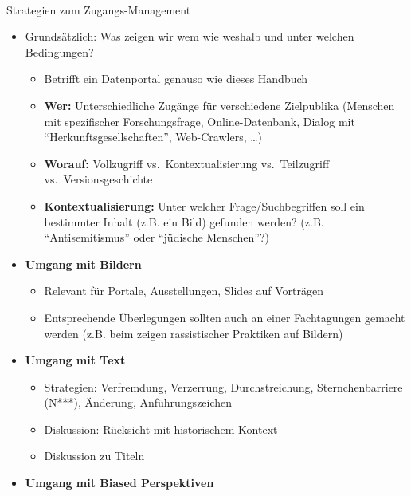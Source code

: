 \documentclass[
  letterpaper,
  DIV=11,
  numbers=noendperiod]{scrartcl}
\makeatletter
\let\oldparagraph\paragraph
\renewcommand{\paragraph}{
    \@ifstar
      \xxxParagraphStar
      \xxxParagraphNoStar
  }
\newcommand{\xxxParagraphStar}[1]{\oldparagraph*{#1}\mbox{}}
\newcommand{\xxxParagraphNoStar}[1]{\oldparagraph{#1}\mbox{}}
\providecommand{\tightlist}{%
  \setlength{\itemsep}{0pt}\setlength{\parskip}{0pt}}\usepackage{longtable,booktabs,array}
\makeatother
\begin{document}
\paragraph{Strategien zum
Zugangs-Management}\label{strategien-zum-zugangs-management}

\begin{itemize}
\tightlist
\item
  Grundsätzlich: Was zeigen wir wem wie weshalb und unter welchen
  Bedingungen?

  \begin{itemize}
  \tightlist
  \item
    Betrifft ein Datenportal genauso wie dieses Handbuch
  \item
    \textbf{Wer:} Unterschiedliche Zugänge für verschiedene Zielpublika
    (Menschen mit spezifischer Forschungsfrage, Online-Datenbank, Dialog
    mit ``Herkunftsgesellschaften'', Web-Crawlers, \ldots)
  \item
    \textbf{Worauf:} Vollzugriff vs.~Kontextualisierung vs.~Teilzugriff
    vs.~Versionsgeschichte
  \item
    \textbf{Kontextualisierung:} Unter welcher Frage/Suchbegriffen soll
    ein bestimmter Inhalt (z.B. ein Bild) gefunden werden? (z.B.
    ``Antisemitismus'' oder ``jüdische Menschen''?)
  \end{itemize}
\item
  \textbf{Umgang mit Bildern}

  \begin{itemize}
  \tightlist
  \item
    Relevant für Portale, Ausstellungen, Slides auf Vorträgen
  \item
    Entsprechende Überlegungen sollten auch an einer Fachtagungen
    gemacht werden (z.B. beim zeigen rassistischer Praktiken auf
    Bildern)
  \end{itemize}
\item
  \textbf{Umgang mit Text}

  \begin{itemize}
  \tightlist
  \item
    Strategien: Verfremdung, Verzerrung, Durchstreichung,
    Sternchenbarriere (N***), Änderung, Anführungszeichen
  \item
    Diskussion: Rücksicht mit historischem Kontext
  \item
    Diskussion zu Titeln
  \end{itemize}
\item
  \textbf{Umgang mit Biased Perspektiven}


\end{itemize}
\end{document}
